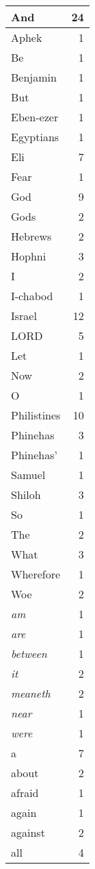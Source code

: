 \begin{center}
\begin{longtable}{l|r}
\hline \hline
\endlastfoot
And & 24 \\ \hline
Aphek & 1 \\ \hline
Be & 1 \\ \hline
Benjamin & 1 \\ \hline
But & 1 \\ \hline
Eben-ezer & 1 \\ \hline
Egyptians & 1 \\ \hline
Eli & 7 \\ \hline
Fear & 1 \\ \hline
God & 9 \\ \hline
Gods & 2 \\ \hline
Hebrews & 2 \\ \hline
Hophni & 3 \\ \hline
I & 2 \\ \hline
I-chabod & 1 \\ \hline
Israel & 12 \\ \hline
LORD & 5 \\ \hline
Let & 1 \\ \hline
Now & 2 \\ \hline
O & 1 \\ \hline
Philistines & 10 \\ \hline
Phinehas & 3 \\ \hline
Phinehas' & 1 \\ \hline
Samuel & 1 \\ \hline
Shiloh & 3 \\ \hline
So & 1 \\ \hline
The & 2 \\ \hline
What & 3 \\ \hline
Wherefore & 1 \\ \hline
Woe & 2 \\ \hline
\emph{am} & 1 \\ \hline
\emph{are} & 1 \\ \hline
\emph{between} & 1 \\ \hline
\emph{it} & 2 \\ \hline
\emph{meaneth} & 2 \\ \hline
\emph{near} & 1 \\ \hline
\emph{were} & 1 \\ \hline
a & 7 \\ \hline
about & 2 \\ \hline
afraid & 1 \\ \hline
again & 1 \\ \hline
against & 2 \\ \hline
all & 4 \\ \hline

\end{longtable}
\end{center}
